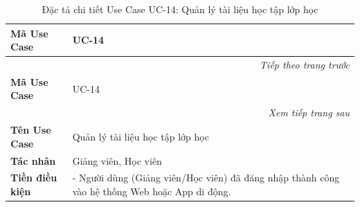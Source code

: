 \documentclass[../DoAn.tex]{subfiles}
\begin{document}
\begin{longtable}{|p{2.8cm}|p{0.8cm}|p{2.2cm}|p{7.5cm}|}
    \caption{Đặc tả chi tiết Use Case UC-14: Quản lý tài liệu học tập lớp học}
    \label{table:spec_uc_14} \\
    \hline
    \textbf{Mã Use Case} & \multicolumn{3}{l|}{UC-14} \\ \hline
    \endfirsthead
    \multicolumn{4}{r}{\textit{Tiếp theo trang trước}} \\
    \hline
    \textbf{Mã Use Case} & \multicolumn{3}{l|}{UC-14} \\ \hline
    \endhead
    \hline
    \multicolumn{4}{r}{\textit{Xem tiếp trang sau}} \\
    \endfoot
    \hline
    \endlastfoot
    \textbf{Tên Use Case} & \multicolumn{3}{l|}{Quản lý tài liệu học tập lớp học} \\ \hline
    \textbf{Tác nhân} & \multicolumn{3}{l|}{Giảng viên, Học viên} \\ \hline
    \textbf{Tiền điều kiện} & \multicolumn{3}{p{10.9cm}|}{- Người dùng (Giảng viên/Học viên) đã đăng nhập thành công vào hệ thống Web hoặc App di động. 

}
\end{longtable}
\end{document}
